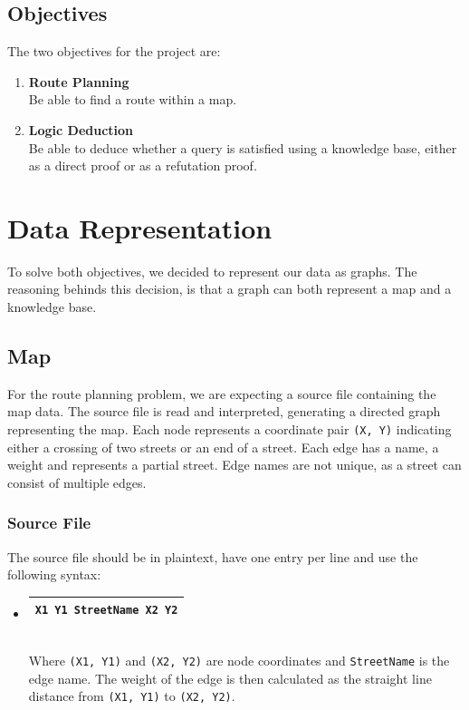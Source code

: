 \documentclass[11pt]{article}
\newcommand{\tbox}[1] {\begin{tabular}{| c |}\hline {#1} \\ \hline\end{tabular}}
\begin{document}
\subsection{Objectives}
The two objectives for the project are:
\begin{enumerate}
	\item[] \textbf{Route Planning}\\
	Be able to find a route within a map.
	
	\item[] \textbf{Logic Deduction}\\
	Be able to deduce whether a query is satisfied using a knowledge base, either as a direct proof or as a refutation proof. 
\end{enumerate}

\section{Data Representation}
To solve both objectives, we decided to represent our data as graphs. The reasoning behinds this decision, is that a graph can both represent a map and a knowledge base.

\subsection{Map}
For the route planning problem, we are expecting a source file containing the map data. The source file is read and interpreted, generating a directed graph representing the map. Each node represents a coordinate pair {\tt (X, Y)} indicating either a crossing of two streets or an end of a street. Each edge has a name, a weight and represents a partial street. Edge names are not unique, as a street can consist of multiple edges.

\subsubsection{Source File}
The source file should be in plaintext, have one entry per line and use the following syntax:
\begin{itemize}
	\item \tbox{\tt X1 Y1 StreetName X2 Y2}\\
	Where {\tt (X1, Y1)} and {\tt (X2, Y2)} are node coordinates and {\tt StreetName} is the edge name. The weight of the edge is then calculated as the straight line distance from {\tt (X1, Y1)} to {\tt (X2, Y2)}.
\end{itemize}
\end{document}
